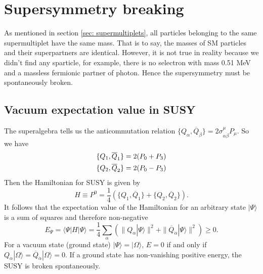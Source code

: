 \documentclass[12pt]{report}
\begin{document}
\chapter{Supersymmetry breaking}

As mentioned in section \ref{sec: supermultiplets}, all particles belonging to the same supermultiplet have the same mass.
That is to say, the masses of SM particles and their superpartners are identical.
However, it is not true in reality because we didn't find any sparticle, for example, there is no selectron with mass 0.51 MeV and a massless fermionic partner of photon.
Hence the supersymmetry must be spontaneously broken.



\section{Vacuum expectation value in SUSY}
The superalgebra tells us the anticommutation relation $\{ Q_{\alpha}, \overline{Q}_{\dot{\beta}} \} = 2 \sigma^{\mu}_{\alpha \dot{\beta}} P_{\mu}$.
So we have
\begin{align}
\{ Q_{1}, \overline{Q}_{1} \} = 2 ( P_{0} + P_{3}) \notag \\
\{ Q_{2}, \overline{Q}_{2} \} = 2 ( P_{0} - P_{3}) 
\end{align}
Then the Hamiltonian for SUSY is given by
\begin{equation}
H \equiv P^{0} = \frac{1}{4} (\{ Q_{1}, \overline{Q}_{1} \}  + \{ Q_{2}, \overline{Q}_{2} \} ) .
\end{equation}
It follows that the expectation value of the Hamiltonian for an arbitrary state $| \Psi \rangle$ is a sum of squares and therefore non-negative
\begin{equation}
E_{\Psi} = \langle \Psi | H | \Psi \rangle = \frac{1}{4} \sum_{\alpha} ( \| Q_{\alpha} | \Psi \rangle \|^2 + \| \overline{Q}_{\dot{\alpha}} | \Psi \rangle \|^2 ) \ge 0 .
\end{equation}
For a vacuum state (ground state) $|\Psi \rangle = | \Omega \rangle$, $E = 0$ if and only if $Q_{\alpha} | \Omega \rangle = \overline{Q}_{\dot{\alpha}} | \Omega \rangle = 0$.
If a ground state has non-vanishing positive energy, the SUSY is broken spontaneously. 
\end{document}
